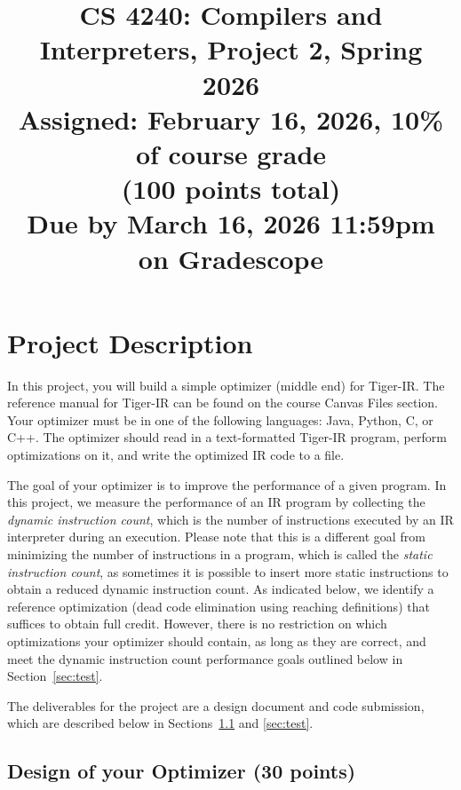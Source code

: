 \documentclass[12pt]{article}
\title{CS 4240: Compilers and Interpreters, Project 2, Spring 2026\\
\Large
Assigned: February 16, 2026, 10\% of course grade\\
(100 points total)\\
Due by March 16, 2026 11:59pm on Gradescope
}
\author{}
\date{}
\begin{document}
\maketitle
\thispagestyle{fancy}

\section{Project Description}
In this project, you will build a simple optimizer (middle end) for Tiger-IR. 
The reference manual for Tiger-IR can be found on the course Canvas Files section.
Your optimizer must be in one of the following languages: Java, Python, C, or C++. The optimizer should read in a text-formatted Tiger-IR program, perform optimizations on it,
and write the optimized IR code to a file.

The goal of your optimizer is to improve the performance of a given program.
In this project, we measure the performance of an IR program by collecting the \emph{dynamic instruction count},
which is the number of instructions executed by an IR interpreter during an execution.
Please note that this is a different goal from minimizing the number of instructions in a program,
which is called the \emph{static instruction count},
as sometimes it is possible to insert more static instructions to
obtain a reduced dynamic instruction count.
As indicated below, we identify a reference optimization (dead code
elimination using reaching definitions) that suffices to obtain full
credit.  However, there is no restriction on which optimizations your optimizer should
contain, as long as they are correct, and meet the dynamic instruction count
performance goals outlined below in Section~\ref{sec:test}.

The deliverables for the project are a design document and code
submission, which are described below in Sections~\ref{sec:opt} and \ref{sec:test}.

\subsection{Design of your Optimizer (30 points)}\label{sec:opt}
\end{document}

